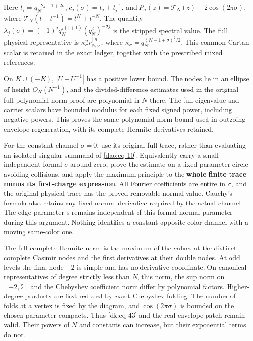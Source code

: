Here \(t_j=q_N^{-2j-1+2\sigma}\), \(c_j(\sigma)=t_j+t_j^{-1}\), and \(P_\sigma(z)=\mathcal T_N(z)+2\cos(2\pi\sigma)\), where \(\mathcal T_N(t+t^{-1})=t^N+t^{-N}\). The quantity \(\lambda_j(\sigma)=(-1)^j q_N^{j(j+1)}(q_N^2)^{-\sigma j}\) is the stripped spectral value. The full physical representative is \(\kappa_\sigma^n r_{N,\sigma}^{[n]}\), where \(\kappa_\sigma=q_N^{(N-1+\sigma)^2/2}\). This common Cartan scalar is retained in the exact ledger, together with the prescribed mixed references.

On \(K\cup(-K)\), \(|U-U^{-1}|\) has a positive lower bound. The nodes lie in an ellipse of height \(O_K(N^{-1})\), and the divided-difference estimates used in the original full-polynomial norm proof are polynomial in \(N\) there. The full eigenvalue and carrier scalars have bounded modulus for each fixed signed power, including negative powers. This proves the same polynomial norm bound used in outgoing-envelope regeneration, with its complete Hermite derivatives retained.

For the constant channel \(\sigma=0\), use its original full trace, rather than evaluating an isolated singular summand of \eqref{dao:eq-10}. Equivalently carry a small independent formal \(\sigma\) around zero, prove the estimate on a fixed parameter circle avoiding collisions, and apply the maximum principle to the \textbf{whole finite trace minus its first-charge expression}. All Fourier coefficients are entire in \(\sigma\), and the original physical trace has the proved removable normal value. Cauchy's formula also retains any fixed normal derivative required by the actual channel. The edge parameter \(s\) remains independent of this formal normal parameter during this argument. Nothing identifies a constant opposite-color channel with a moving same-color one.

The full complete Hermite norm is the maximum of the values at the distinct complete Casimir nodes and the first derivatives at their double nodes. At odd levels the final node \(-2\) is simple and has no derivative coordinate. On canonical representatives of degree strictly less than \(N\), this norm, the sup norm on \([-2,2]\) and the Chebyshev coefficient norm differ by polynomial factors. Higher-degree products are first reduced by exact Chebyshev folding. The number of folds at a vertex is fixed by the diagram, and \(\cos(2\pi\sigma)\) is bounded on the chosen parameter compacts. Thus \eqref{dk:eq-43} and the real-envelope patch remain valid. Their powers of \(N\) and constants can increase, but their exponential terms do not.

